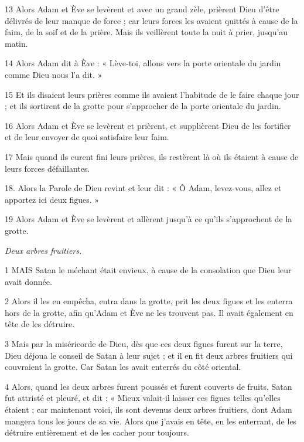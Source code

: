 \par 13 Alors Adam et Ève se levèrent et avec un grand zèle, prièrent Dieu d'être délivrés de leur manque de force ; car leurs forces les avaient quittés à cause de la faim, de la soif et de la prière. Mais ils veillèrent toute la nuit à prier, jusqu'au matin.

\par 14 Alors Adam dit à Ève : « Lève-toi, allons vers la porte orientale du jardin comme Dieu nous l'a dit. »

\par 15 Et ils disaient leurs prières comme ils avaient l'habitude de le faire chaque jour ; et ils sortirent de la grotte pour s'approcher de la porte orientale du jardin.

\par 16 Alors Adam et Ève se levèrent et prièrent, et supplièrent Dieu de les fortifier et de leur envoyer de quoi satisfaire leur faim.

\par 17 Mais quand ils eurent fini leurs prières, ils restèrent là où ils étaient à cause de leurs forces défaillantes.

\par 18. Alors la Parole de Dieu revint et leur dit : « Ô Adam, levez-vous, allez et apportez ici deux figues. »

\par 19 Alors Adam et Ève se levèrent et allèrent jusqu'à ce qu'ils s'approchent de la grotte.


\par \textit{Deux arbres fruitiers.}

\par 1 MAIS Satan le méchant était envieux, à cause de la consolation que Dieu leur avait donnée.

\par 2 Alors il les en empêcha, entra dans la grotte, prit les deux figues et les enterra hors de la grotte, afin qu'Adam et Ève ne les trouvent pas. Il avait également en tête de les détruire.

\par 3 Mais par la miséricorde de Dieu, dès que ces deux figues furent sur la terre, Dieu déjoua le conseil de Satan à leur sujet ; et il en fit deux arbres fruitiers qui couvraient la grotte. Car Satan les avait enterrés du côté oriental.

\par 4 Alors, quand les deux arbres furent poussés et furent couverts de fruits, Satan fut attristé et pleuré, et dit : « Mieux valait-il laisser ces figues telles qu'elles étaient ; car maintenant voici, ils sont devenus deux arbres fruitiers, dont Adam mangera tous les jours de sa vie. Alors que j’avais en tête, en les enterrant, de les détruire entièrement et de les cacher pour toujours.

